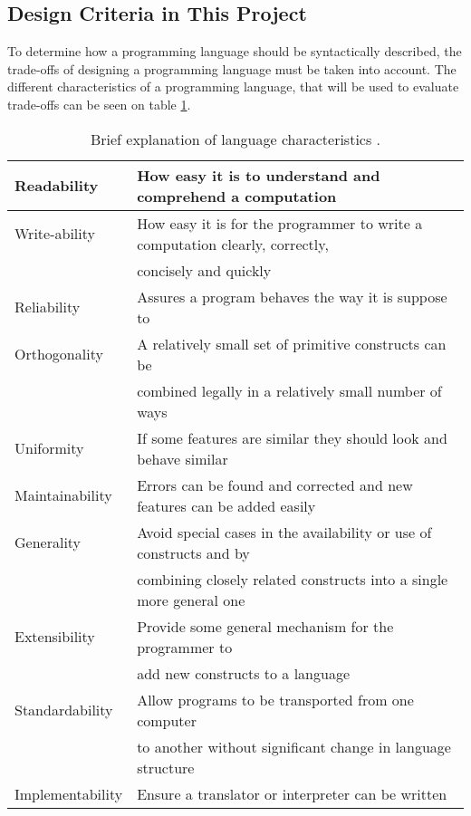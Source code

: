 \subsection{Design Criteria in This Project}
To determine how a programming language should be syntactically described, the trade-offs of designing a programming language must be taken into account. The different characteristics of a programming language, that will be used to evaluate trade-offs can be seen on table \ref{tab:langCharacteristics}.

\begin{table}[H]
	\begin{tabular}{|l|l|}
		\hline
		Readability 		& How easy it is to understand and comprehend a computation 					\\ \hline
		Write-ability 		& How easy it is for the programmer to write a computation clearly, correctly, 	\\
		~ 					& concisely and quickly 														\\ \hline
		Reliability 		& Assures a program behaves the way it is suppose to 							\\ \hline
		Orthogonality 		& A relatively small set of primitive constructs can be 						\\
		~ 					& combined legally in a relatively small number of ways 						\\ \hline		
		Uniformity 			& If some features are similar they should look and behave similar 				\\ \hline
		Maintainability 	& Errors can be found and corrected and new features can be added easily 		\\ \hline
		Generality 			& Avoid special cases in the availability or use of constructs and by 			\\ 
		~ 					& combining closely related constructs into a single more general one 			\\ \hline
		Extensibility 		& Provide some general mechanism for the programmer to 							\\
		~ 					& add new constructs to a language 												\\ \hline
		Standardability 	& Allow programs to be transported from one computer 							\\
		~ 					& to another without significant change in language structure 					\\ \hline
		Implementability 	& Ensure a translator or interpreter can be written 							\\ \hline
	\end{tabular}
	\caption{Brief explanation of language characteristics \citep{sebesta}.}
	\label{tab:langCharacteristics}
\end{table}

